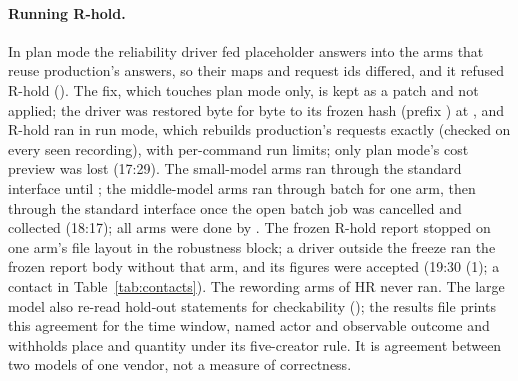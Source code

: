 \paragraph{Running R-hold.} In plan mode the reliability driver fed placeholder answers into the arms that reuse
production's answers, so their maps and request ids differed, and it refused R-hold (\PlanModeRefusedStamp). The fix,
which touches plan mode only, is kept as a patch and not applied; the driver was restored byte for byte to its frozen
hash (prefix \ReliabilityPrefix) at \ReliabilityRestoredStamp, and R-hold ran in run mode, which rebuilds production's
requests exactly (checked on every seen recording), with per-command run limits; only plan mode's cost preview was lost
(17:29). The small-model arms ran through the standard interface until \RholdSmallStamp; the middle-model arms ran
through batch for one arm, then through the standard interface once the open batch job was cancelled and collected
(18:17); all \RholdArms{} arms were done by \RholdDoneStamp. The frozen R-hold report stopped on one arm's file layout
in the robustness block; a driver outside the freeze ran the frozen report body without that arm, and its figures were
accepted (19:30 (1); a contact in Table~\ref{tab:contacts}). The rewording arms of HR never ran. The large model also
re-read \ChkHoldoutStatements{} hold-out statements for checkability (\ChkHoldoutStamp); the results file prints this
agreement for the time window, named actor and observable outcome and withholds place and quantity under its
five-creator rule. It is agreement between two models of one vendor, not a measure of correctness.

